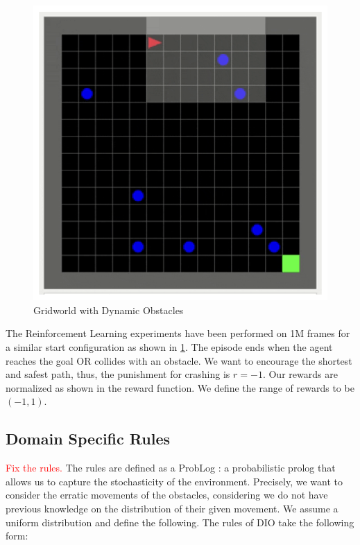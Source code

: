 \begin{multicols}{2}[\medskip]
    \begin{figure}[H]
      \centering
      \includegraphics[scale=0.55]{figures/gridworldrl.png}
      \caption{Gridworld with Dynamic Obstacles}
      \label{fig:gridrl}
    \end{figure}
    \columnbreak
    The Reinforcement Learning experiments have been performed on 1M frames for a similar start configuration as shown in \ref{fig:gridrl}. The episode ends when the agent 
    reaches the goal OR collides with an obstacle. We want to encourage the shortest and safest path, thus, the punishment for crashing is $r = -1$. Our rewards are normalized as shown in
    the reward function. We define the range of rewards to be $(-1,1)$. 
\end{multicols}

\subsection{Domain Specific Rules}
\textcolor{red}{Fix the rules.}
The rules are defined as a ProbLog \cite{problog}: a probabilistic prolog that allows us to capture 
the stochasticity of the environment. Precisely, we want to consider the erratic movements of the obstacles, considering 
we do not have previous knowledge on the distribution of their given movement. We assume a uniform distribution and define the following. 
The rules of DIO take the following form: 

